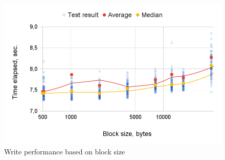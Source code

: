 \documentclass[conference]{IEEEtran}
\begin{document}
\begin{figure}
    \centering
    \includegraphics[width=0.9\linewidth]{write_bs_1.png}
    \caption{Write performance based on block size}
    \label{fig:write-block-size}
\end{figure}
\end{document}
